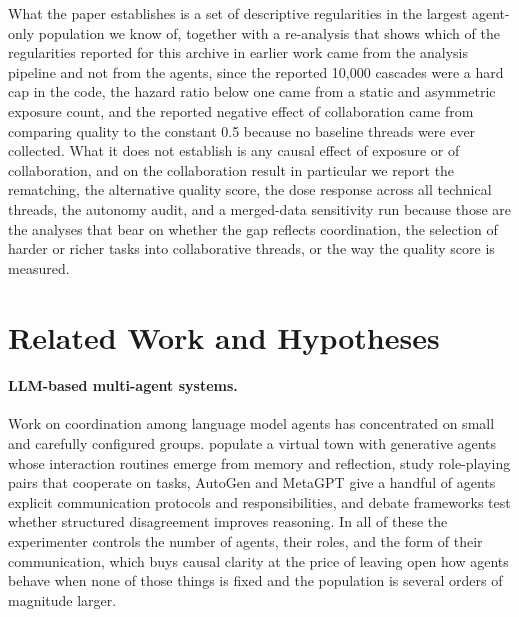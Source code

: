 \documentclass{article}
\begin{document}
What the paper establishes is a set of descriptive regularities in the largest agent-only population we know of, together with a re-analysis that shows which of the regularities reported for this archive in earlier work came from the analysis pipeline and not from the agents, since the reported 10,000 cascades were a hard cap in the code, the hazard ratio below one came from a static and asymmetric exposure count, and the reported negative effect of collaboration came from comparing quality to the constant 0.5 because no baseline threads were ever collected. What it does not establish is any causal effect of exposure or of collaboration, and on the collaboration result in particular we report the rematching, the alternative quality score, the dose response across all technical threads, the autonomy audit, and a merged-data sensitivity run because those are the analyses that bear on whether the gap reflects coordination, the selection of harder or richer tasks into collaborative threads, or the way the quality score is measured.

\section{Related Work and Hypotheses}
\label{sec:related}

\paragraph{LLM-based multi-agent systems.}
Work on coordination among language model agents has concentrated on small and carefully configured groups. \citet{park2023generative} populate a virtual town with generative agents whose interaction routines emerge from memory and reflection, \citet{li2023camel} study role-playing pairs that cooperate on tasks, AutoGen \citep{wu2023autogen} and MetaGPT \citep{hong2023metagpt} give a handful of agents explicit communication protocols and responsibilities, and debate frameworks \citep{liang2023encouraging, du2023improving} test whether structured disagreement improves reasoning. In all of these the experimenter controls the number of agents, their roles, and the form of their communication, which buys causal clarity at the price of leaving open how agents behave when none of those things is fixed and the population is several orders of magnitude larger.
\end{document}
